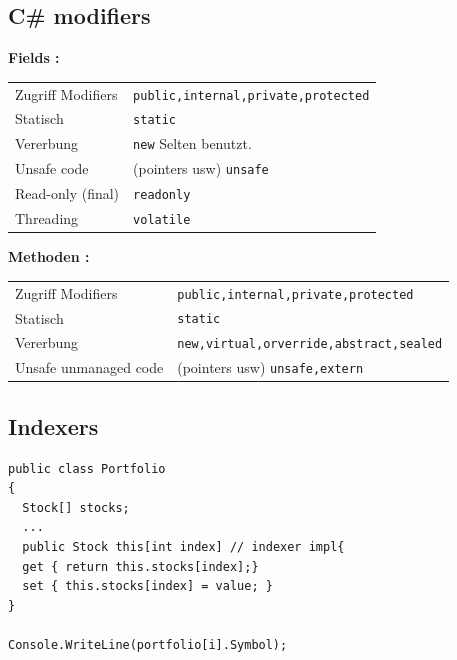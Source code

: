 \documentclass[a4paper,10pt]{scrartcl}
\begin{document}
\subsection{C\# modifiers}

\textbf{Fields :}\\ \linebreak
\begin{tabular}{l | l}
\hline
Zugriff Modifiers & \texttt{public,internal,private,protected}\\
Statisch & \texttt{static}\\
Vererbung & \texttt{new} Selten benutzt. \\
Unsafe code & (pointers usw) \texttt{unsafe}\\
Read-only (final) & \texttt{readonly} \\
Threading & \texttt{volatile} \\
\hline
\end{tabular}

\textbf{Methoden :}\\ \linebreak
\begin{tabular}{l | l}
\hline
Zugriff Modifiers & \texttt{public,internal,private,protected}\\
Statisch & \texttt{static}\\
Vererbung & \texttt{new,virtual,orverride,abstract,sealed} \\
Unsafe unmanaged code & (pointers usw) \texttt{unsafe,extern}\\
\hline
\end{tabular}

\subsection{Indexers}

\begin{lstlisting}[caption=Indeexers]
 public class Portfolio
{
  Stock[] stocks;
  ...
  public Stock this[int index] // indexer impl{
  get { return this.stocks[index];}
  set { this.stocks[index] = value; }
}

Console.WriteLine(portfolio[i].Symbol);

\end{lstlisting}
\end{document}
